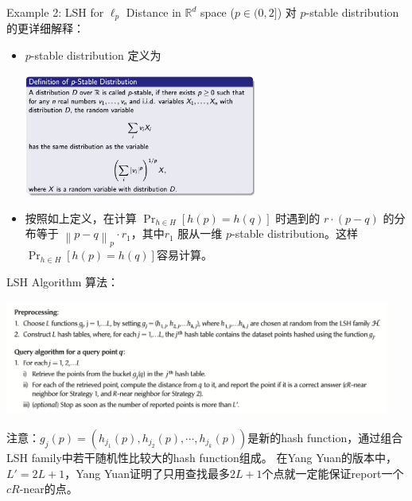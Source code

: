 \begin{frame}{Example 2: LSH for $\ell_p$ Distance in $\mathbb{R}^{d} $ space ($p \in (0, 2]$)}
    对 $p$-stable distribution 的更详细解释：

    \begin{itemize}
        \item  $p$-stable distribution 定义为
        \begin{center}
            \includegraphics[width=0.6\textwidth]{assets/psd.png}
        \end{center}
        \item 按照如上定义，在计算 $\Pr_{h \in H}[h(p) = h(q)]$ 时遇到的 $r \cdot (p-q)$ 的分布等于 $\left\| p-q \right\|_p \cdot r_1 $，其中$r_1$ 服从一维 $p$-stable distribution。这样$\Pr_{h \in H}[h(p) = h(q)]$容易计算。
    \end{itemize}
    
\end{frame}

\begin{frame}{LSH Algorithm}
    算法：
    \begin{center}
        \includegraphics[width=0.95\textwidth]{assets/lsh.png}
    \end{center}
    注意：$g_j(p) = (h_{j_1}(p), h_{j_2}(p), \cdots, h_{j_k}(p))$是新的hash function，通过组合LSH family中若干随机性比较大的hash function组成。
    在Yang Yuan的版本中，$L' = 2L+1$，Yang Yuan证明了只用查找最多$2L+1$个点就一定能保证report一个$cR$-near的点。
\end{frame}

